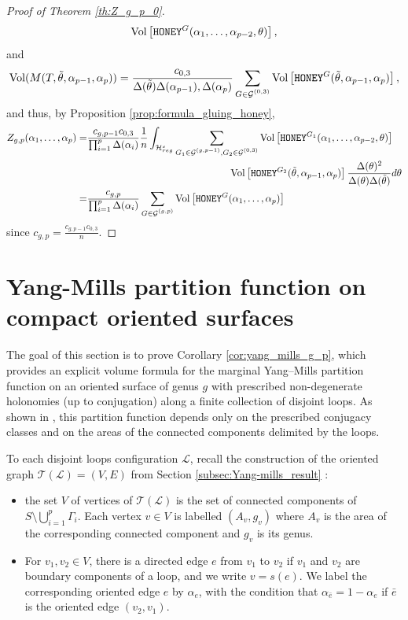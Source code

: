 \documentclass[11pt,a4paper]{amsart}
\providecommand{\Vol}{\operatorname{Vol}}
\providecommand{\honey}{\texttt{\textsc{HONEY}}}
\numberwithin{equation}{section}
\theoremstyle{definition}
\begin{document}
\begin{proof}[Proof of Theorem \ref{th:Z_g_p_0}]
$$        \Vol \left[ \honey^G(\alpha_1, 
        \dots, \alpha_{p-2},\theta) \right],$$
 and
 $$\Vol(M(T,\tilde{\theta},\alpha_{p-1},\alpha_p)) = 
 \frac{c_{0,3}}{\Delta(\tilde{\theta})\Delta(\alpha_{p-1}),\Delta(\alpha_{p})}\sum_{\substack{G \in \mathcal{G}^{(0,3)}}}
        \Vol \left[ \honey^G(\tilde{\theta}, \alpha_{p-1},\alpha_{p}) \right],$$
 and thus, by Proposition \ref{prop:formula_gluing_honey},
\begin{align*}
Z_{g,p}(\alpha_1,\dots,\alpha_p)
 =&\frac{c_{g,p-1}c_{0,3}}{\prod_{i=1}^{p}\Delta(\alpha_{i})}\frac{1}{n}\int_{\mathcal{H}_{reg}^s}\sum_{\substack{G_1 \in \mathcal{G}^{(g,p-1)},G_2\in \mathcal{G}^{(0,3)}}}
        \Vol \left[ \honey^{G_1}(\alpha_1, 
        \dots, \alpha_{p-2},\theta)\right]\\
        &\hspace{5cm}\Vol \left[ \honey^{G_2}(\tilde{\theta}, 
        \alpha_{p-1},\alpha_{p})\right]\frac{\Delta(\theta)^2}{\Delta(\theta)\Delta(\tilde{\theta})}d\theta\\
        =&\frac{c_{g,p}}{\prod_{i=1}^{p}\Delta(\alpha_{i})}\sum_{\substack{G \in \mathcal{G}^{(g,p)}}}
        \Vol \left[ \honey^G(\alpha_1, 
        \dots, \alpha_p) \right] 
\end{align*}
since $c_{g,p}=\frac{c_{g,p-1}c_{0,3}}{n}$.
\end{proof}


\section{Yang-Mills partition function on compact oriented surfaces}
\label{sec:proof_positive_area}

The goal of this section is to prove Corollary \ref{cor:yang_mills_g_p}, which provides an explicit volume formula 
for the marginal Yang–Mills partition function on an oriented surface of genus $g$ 
with prescribed non-degenerate holonomies (up to conjugation) 
along a finite collection of disjoint loops. 
As shown in \cite{levy2003yang}, this partition function depends 
only on the prescribed conjugacy classes and on the areas of the 
connected components delimited by the loops. 

To each disjoint loops configuration $\mathcal{L}$, recall the construction of the oriented graph $\mathcal{T}(\mathcal{L})=(V,E)$ from Section \ref{subsec:Yang-mills_result} :
\begin{itemize}
\item the set $V$ of vertices of $\mathcal{T}(\mathcal{L})$ is the set of connected components of $S\setminus \bigcup_{i=1}^p\Gamma_i$. 
Each vertex $v\in V$ is labelled $(A_v,g_v)$ where $A_v$ is the area of the corresponding connected component and $g_v$ is its genus.
\item For $v_1,v_2\in V$, there is a directed edge $e$ from $v_1$ to $v_2$ 
if $v_1$ and $v_2$ are boundary components of a loop, and we write $v=s(e)$. We label the corresponding oriented edge $e$ by $\alpha_e$, with the condition that $\alpha_{\bar{e}}=1-\alpha_e$ if $\bar{e}$ is the oriented edge $(v_2,v_1)$.
\end{itemize}
\end{document}
